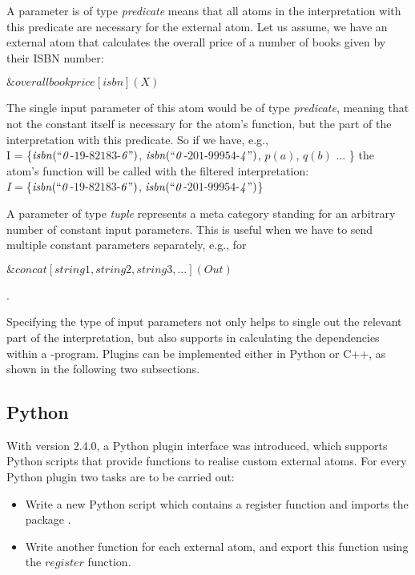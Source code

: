 \documentclass[a4paper, titlepage]{article}
\newcommand{\ext}[3]{\ensuremath{\&{#1}[#2](#3)}}
\newcommand\mycenterline[1]{\par\smallskip\centerline{#1} \smallskip}
\begin{document}
A parameter is of type \emph{predicate} means that 
all atoms in the interpretation with this predicate are 
necessary for the external atom. Let us assume, we have an external 
atom that calculates the overall price of a number of books 
given by their ISBN number:\\
\mycenterline{$\ext{overallbookprice}{isbn}{X}$}
The single input parameter of this atom would be of type 
\emph{predicate}, meaning that not the constant itself is 
necessary for the atom's function, but the part of the 
interpretation with this predicate. So if we have, e.g.,\\ 
I = \{$\mathit{isbn(``0}$-$\mathit{19}$-$\mathit{82183}$-$\mathit{6")}$, $ \mathit{isbn(``0}$-$\mathit{201}$-$\mathit{99954}$-$\mathit{4")}$, $p(a)$, $q(b)$ $\dots$ \}
the atom's function will be called with the filtered interpretation: \\
$I=$\{$\mathit{isbn(``0}$-$\mathit{19}$-$\mathit{82183}$-$\mathit{6")}$, $ \mathit{isbn(``0}$-$\mathit{201}$-$\mathit{99954}$-$\mathit{4")}$\}

A parameter of type \emph{tuple} represents a meta category standing for an arbitrary number of constant input parameters. This is useful when we have to send multiple constant parameters separately, e.g., for \\
\mycenterline{$\ext{concat}{string1, string2, string3, \dots}{Out}$}. 

Specifying the type of input parameters not only helps to 
single out the relevant part of the interpretation, but 
also supports \dlvhex{} in calculating the dependencies 
within a \hex-program. Plugins can be implemented either in Python or C++, as shown in the following two subsections.

\subsection{Python}
With \dlvhex{} version 2.4.0, a Python plugin interface was 
introduced, which supports Python scripts that provide 
functions to realise custom external atoms. For every Python plugin two tasks are to be carried out:
\begin{itemize}
\item Write a new Python script which contains a register function and imports the package \dlvhex{}.
\item Write another function for each external atom, and export this function using the $\mathit{register}$ function. 
\end{itemize}
\end{document}

